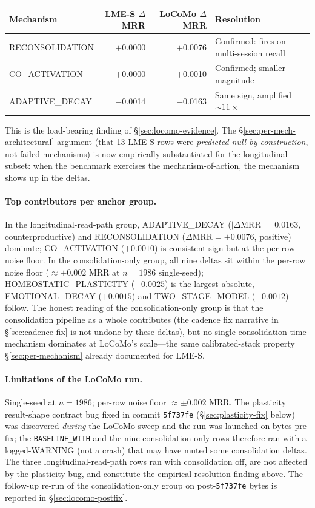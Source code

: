 \documentclass[11pt]{article}
\begin{document}
\begin{center}
\small
\begin{tabular}{lrrl}
\toprule
Mechanism        & LME-S $\Delta$MRR & LoCoMo $\Delta$MRR & Resolution \\
\midrule
RECONSOLIDATION  & $+$0.0000 & $+$0.0076 & Confirmed: fires on multi-session recall \\
CO\_ACTIVATION   & $+$0.0000 & $+$0.0010 & Confirmed; smaller magnitude \\
ADAPTIVE\_DECAY  & $-$0.0014 & $-$0.0163 & Same sign, amplified $\sim 11\times$ \\
\bottomrule
\end{tabular}
\end{center}

This is the load-bearing finding of \S\ref{sec:locomo-evidence}.  The
\S\ref{sec:per-mech-architectural} argument (that 13 LME-S rows were
\emph{predicted-null by construction}, not failed mechanisms) is now
empirically substantiated for the longitudinal subset: when the
benchmark exercises the mechanism-of-action, the mechanism shows up
in the deltas.

\paragraph{Top contributors per anchor group.}  In the
longitudinal-read-path group, ADAPTIVE\_DECAY ($|\Delta\text{MRR}| =
0.0163$, counterproductive) and RECONSOLIDATION ($\Delta\text{MRR} =
+0.0076$, positive) dominate; CO\_ACTIVATION ($+0.0010$) is
consistent-sign but at the per-row noise floor.  In the
consolidation-only group, all nine deltas sit within the per-row
noise floor ($\approx \pm 0.002$ MRR at $n = 1986$ single-seed);
HOMEOSTATIC\_PLASTICITY ($-0.0025$) is the largest absolute,
EMOTIONAL\_DECAY ($+0.0015$) and TWO\_STAGE\_MODEL ($-0.0012$)
follow.  The honest reading of the consolidation-only group is that
the consolidation pipeline as a whole contributes (the cadence fix
narrative in \S\ref{sec:cadence-fix} is not undone by these deltas),
but no single consolidation-time mechanism dominates at LoCoMo's
scale---the same calibrated-stack property
\S\ref{sec:per-mechanism} already documented for LME-S.

\paragraph{Limitations of the LoCoMo run.}  Single-seed at
$n = 1986$; per-row noise floor $\approx \pm 0.002$ MRR.  The
plasticity result-shape contract bug fixed in commit \texttt{5f737fe}
(\S\ref{sec:plasticity-fix} below) was discovered \emph{during} the
LoCoMo sweep and the run was launched on bytes pre-fix; the
\texttt{BASELINE\_WITH} and the nine consolidation-only rows
therefore ran with a logged-WARNING (not a crash) that may have
muted some consolidation deltas.  The three longitudinal-read-path
rows ran with consolidation off, are not affected by the plasticity
bug, and constitute the empirical resolution finding above.  The
follow-up re-run of the consolidation-only group on
post-\texttt{5f737fe} bytes is reported in
\S\ref{sec:locomo-postfix}.
\end{document}
